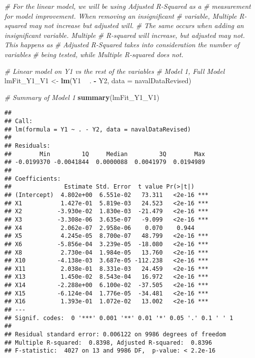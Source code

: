 \documentclass[
]{article}
\newenvironment{Shaded}{\begin{snugshade}}{\end{snugshade}}
\newcommand{\CommentTok}[1]{\textcolor[rgb]{0.56,0.35,0.01}{\textit{#1}}}
\newcommand{\DataTypeTok}[1]{\textcolor[rgb]{0.13,0.29,0.53}{#1}}
\newcommand{\KeywordTok}[1]{\textcolor[rgb]{0.13,0.29,0.53}{\textbf{#1}}}
\newcommand{\NormalTok}[1]{#1}
\newcommand{\OperatorTok}[1]{\textcolor[rgb]{0.81,0.36,0.00}{\textbf{#1}}}
\newcommand{\StringTok}[1]{\textcolor[rgb]{0.31,0.60,0.02}{#1}}
\begin{document}
\begin{Shaded}
\begin{Highlighting}[]
\CommentTok{# For the linear model, we will be using Adjusted R-Squared as a }
\CommentTok{# measurement for model improvement. When removing an insignificant}
\CommentTok{# variable, Multiple R-squared may not increase but adjusted will.}
\CommentTok{# The same occurs when adding an insignificant variable. Multiple }
\CommentTok{# R-squared will increase, but adjusted may not. This happens as }
\CommentTok{# Adjusted R-Squared takes into consideration the number of variables}
\CommentTok{# being tested, while Multiple R-squared does not.}

\CommentTok{# Linear model on Y1 vs the rest of the variables}
\CommentTok{# Model 1, Full Model}
\NormalTok{lmFit_Y1_V1 <-}\StringTok{ }\KeywordTok{lm}\NormalTok{(Y1 }\OperatorTok{~}\StringTok{ }\NormalTok{. }\OperatorTok{-}\StringTok{ }\NormalTok{Y2, }\DataTypeTok{data =}\NormalTok{ navalDataRevised)}

\CommentTok{# Summary of Model 1}
\KeywordTok{summary}\NormalTok{(lmFit_Y1_V1)}
\end{Highlighting}
\end{Shaded}

\begin{verbatim}
## 
## Call:
## lm(formula = Y1 ~ . - Y2, data = navalDataRevised)
## 
## Residuals:
##        Min         1Q     Median         3Q        Max 
## -0.0199370 -0.0041844  0.0000088  0.0041979  0.0194989 
## 
## Coefficients:
##               Estimate Std. Error  t value Pr(>|t|)    
## (Intercept)  4.802e+00  6.551e-02   73.311   <2e-16 ***
## X1           1.427e-01  5.819e-03   24.523   <2e-16 ***
## X2          -3.930e-02  1.830e-03  -21.479   <2e-16 ***
## X3          -3.308e-06  3.635e-07   -9.099   <2e-16 ***
## X4           2.062e-07  2.958e-06    0.070    0.944    
## X5           4.245e-05  8.700e-07   48.799   <2e-16 ***
## X6          -5.856e-04  3.239e-05  -18.080   <2e-16 ***
## X8           2.730e-04  1.984e-05   13.760   <2e-16 ***
## X10         -4.138e-03  3.687e-05 -112.238   <2e-16 ***
## X11          2.038e-01  8.331e-03   24.459   <2e-16 ***
## X13          1.450e-02  8.543e-04   16.972   <2e-16 ***
## X14         -2.288e+00  6.100e-02  -37.505   <2e-16 ***
## X15         -6.124e-04  1.776e-05  -34.481   <2e-16 ***
## X16          1.393e-01  1.072e-02   13.002   <2e-16 ***
## ---
## Signif. codes:  0 '***' 0.001 '**' 0.01 '*' 0.05 '.' 0.1 ' ' 1
## 
## Residual standard error: 0.006122 on 9986 degrees of freedom
## Multiple R-squared:  0.8398, Adjusted R-squared:  0.8396 
## F-statistic:  4027 on 13 and 9986 DF,  p-value: < 2.2e-16
\end{verbatim}
\end{document}
